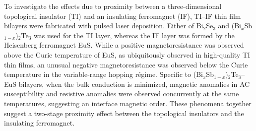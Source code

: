 To investigate the effects due to proximity between a three-dimensional topological insulator (TI) and an insulating ferromagnet (IF), TI--IF thin film bilayers were fabricated with pulsed laser deposition. Either of Bi$_2$Se$_3$ and (Bi$_x$Sb$_{1-x}$)$_2$Te$_3$ was used for the TI layer, whereas the IF layer was formed by the Heisenberg ferromagnet EuS. While a positive magnetoresistance was observed above the Curie temperature of EuS, as ubiquitously observed in high-quality TI thin films, an unusual negative magnetoresistance was observed below the Curie temperature in the variable-range hopping r\'egime. Specific to (Bi$_x$Sb$_{1-x}$)$_2$Te$_3$--EuS bilayers, when the bulk conduction is minimized, magnetic anomalies in AC susceptibility and resistive anomalies were observed concurrently at the same temperatures, suggesting an interface magnetic order. These phenomena together suggest a two-stage proximity effect between the topological insulators and the insulating ferromagnet.